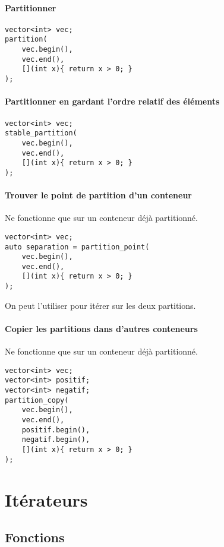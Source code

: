 \documentclass[10pt,a4paper,french]{article}
\begin{document}
\paragraph{Partitionner}
\begin{verbatim}
vector<int> vec;
partition(
    vec.begin(),
    vec.end(),
    [](int x){ return x > 0; }
);
\end{verbatim}

\paragraph{Partitionner en gardant l'ordre relatif des éléments}
\begin{verbatim}
vector<int> vec;
stable_partition(
    vec.begin(),
    vec.end(),
    [](int x){ return x > 0; }
);
\end{verbatim}

\paragraph{Trouver le point de partition d'un conteneur}
Ne fonctionne que sur un conteneur déjà partitionné.
\begin{verbatim}
vector<int> vec;
auto separation = partition_point(
    vec.begin(),
    vec.end(),
    [](int x){ return x > 0; }
);
\end{verbatim}

On peut l'utiliser pour itérer sur les deux partitions.

\paragraph{Copier les partitions dans d'autres conteneurs} Ne fonctionne que sur un conteneur déjà partitionné.
\begin{verbatim}
vector<int> vec;
vector<int> positif;
vector<int> negatif;
partition_copy(
    vec.begin(),
    vec.end(),
    positif.begin(),
    negatif.begin(),
    [](int x){ return x > 0; }
);
\end{verbatim}

\section{Itérateurs}\label{iterators}

\subsection{Fonctions}
\end{document}
